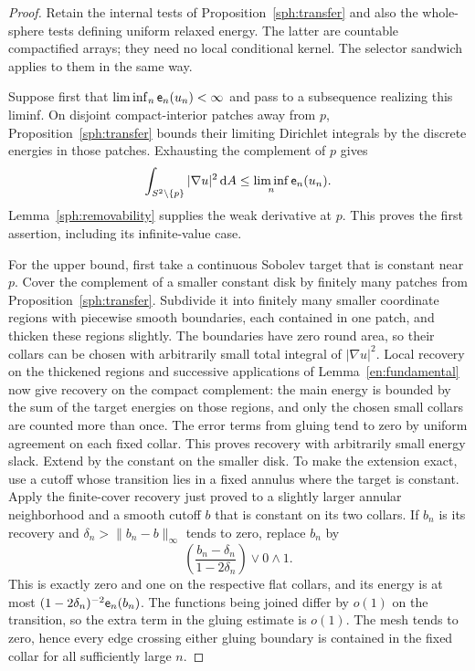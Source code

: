 \begin{proof}
Retain the internal tests of Proposition~\ref{sph:transfer} and also
the whole-sphere tests defining uniform relaxed energy.  The latter
are countable compactified arrays; they need no local conditional
kernel.  The selector sandwich applies to them in the same way.

Suppose first that $\liminf_n\mathsf e_n(u_n)<\infty$ and pass to a subsequence
realizing this liminf.  On disjoint compact-interior patches away from
$p$, Proposition~\ref{sph:transfer} bounds their limiting Dirichlet
integrals by the discrete energies in those patches.  Exhausting the
complement of $p$ gives
\[
 \int_{S^2\setminus\{p\}}|\nabla u|^2\,\mathrm d A
 \le\liminf_n\mathsf e_n(u_n).
\]
Lemma~\ref{sph:removability} supplies the weak derivative at $p$.
This proves the first assertion, including its infinite-value case.

For the upper bound, first take a continuous Sobolev target that is
constant near $p$.  Cover the complement of a smaller constant disk
by finitely many patches from Proposition~\ref{sph:transfer}.
Subdivide it into finitely many smaller coordinate regions with
piecewise smooth boundaries, each contained in one patch, and thicken
these regions slightly.  The boundaries have zero round area, so
their collars can be chosen with arbitrarily small total integral
of $|\nabla u|^2$.  Local recovery on the thickened regions and
successive applications of Lemma~\ref{en:fundamental} now give
recovery on the compact complement: the main energy is bounded by
the sum of the target energies on those regions, and only the
chosen small collars are counted more than once.  The error terms
from gluing tend to zero by uniform agreement on each fixed
collar.  This proves recovery with arbitrarily small energy slack.
Extend by the constant on the
smaller disk.  To make the extension exact, use a cutoff whose
transition lies in a fixed annulus where the target is constant.
Apply the finite-cover recovery just proved to a slightly larger
annular neighborhood and a smooth cutoff $b$ that is constant on
its two collars.  If $b_n$ is its recovery and
$\delta_n>\|b_n-b\|_\infty$ tends to zero, replace $b_n$ by
\[
 \left(\frac{b_n-\delta_n}{1-2\delta_n}\right)\vee0\wedge1.
\]
This is exactly zero and one on the respective flat collars, and
its energy is at most $(1-2\delta_n)^{-2}\mathsf e_n(b_n)$.
The functions being joined differ by $o(1)$
on the transition, so the extra term in the gluing estimate is $o(1)$.
The mesh tends to zero, hence every edge crossing either gluing
boundary is contained in the fixed collar for all sufficiently large
$n$.


\end{proof}
